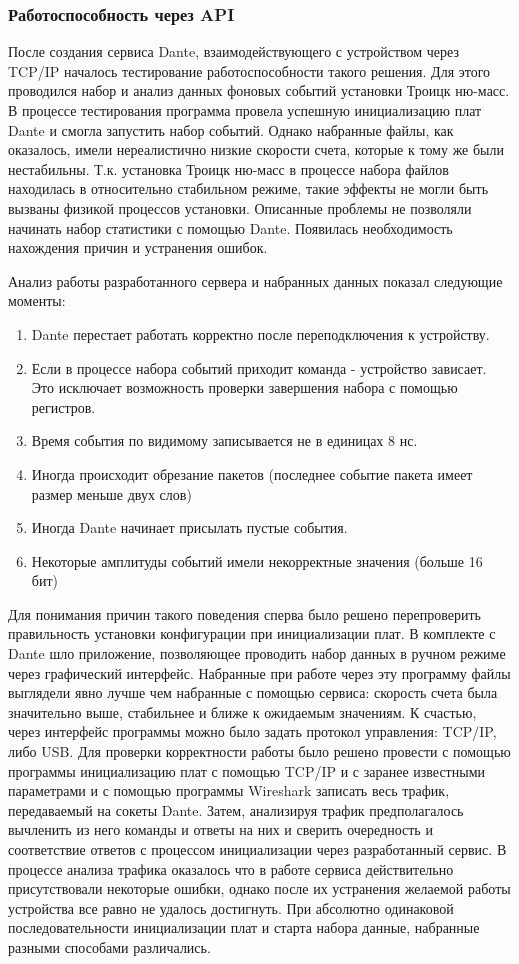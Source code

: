 \documentclass[a4paper,14pt]{extreport}
\begin{document}
\subsubsection{Работоспособность через API}

После создания сервиса Dante, взаимодействующего с устройством через TCP/IP началось тестирование работоспособности такого решения. Для этого проводился набор и анализ данных фоновых событий установки Троицк ню-масс. В процессе тестирования программа провела успешную инициализацию плат Dante и смогла запустить набор событий. Однако набранные файлы, как оказалось, имели нереалистично низкие скорости счета, которые к тому же были нестабильны. Т.к. установка Троицк ню-масс в процессе набора файлов находилась в относительно стабильном режиме, такие эффекты не могли быть вызваны физикой процессов установки. Описанные проблемы не позволяли начинать набор статистики с помощью Dante. Появилась необходимость нахождения причин и устранения ошибок.

Анализ работы разработанного сервера и набранных данных показал следующие моменты:

\begin{enumerate}
    \item Dante перестает работать корректно после переподключения к устройству. 
    \item Если в процессе набора событий приходит команда - устройство зависает. Это исключает возможность проверки завершения набора с помощью регистров.
    \item Время события по видимому записывается не в единицах 8 нс.
    \item Иногда происходит обрезание пакетов (последнее событие пакета имеет размер меньше двух слов)
    \item Иногда Dante начинает присылать пустые события.
    \item Некоторые амплитуды событий имели некорректные значения (больше 16 бит)
\end{enumerate}

Для понимания причин такого поведения сперва было решено перепроверить правильность установки конфигурации при инициализации плат. В комплекте с Dante шло приложение, позволяющее проводить набор данных в ручном режиме через графический интерфейс. Набранные при работе через эту программу файлы выглядели явно лучше чем набранные с помощью сервиса: скорость счета была значительно выше, стабильнее и ближе к ожидаемым значениям. К счастью, через интерфейс программы можно было задать протокол управления: TCP/IP, либо USB. Для проверки корректности работы было решено провести с помощью программы инициализацию плат с помощью TCP/IP и с заранее известными параметрами и с помощью программы Wireshark записать весь трафик, передаваемый на сокеты Dante. Затем, анализируя трафик предполагалось вычленить из него команды и ответы на них и сверить очередность и соответствие ответов с процессом инициализации через разработанный сервис. В процессе анализа трафика оказалось что в работе сервиса действительно присутствовали некоторые ошибки, однако после их устранения желаемой работы устройства все равно не удалось достигнуть. При абсолютно одинаковой последовательности инициализации плат и старта набора данные, набранные разными способами различались.
\end{document}
